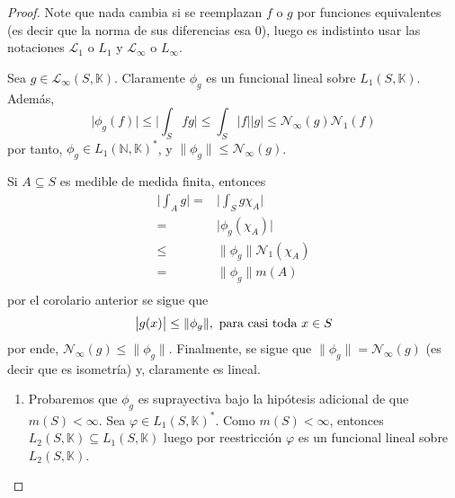 \documentclass[12pt]{report}
\theoremstyle{largebreak}
\newcommand\abs[1]{\ensuremath{\big|#1\big|}}
\newcommand\norm[1]{\ensuremath{\|#1\|}}
\newcommand{\N}[2]{\ensuremath{\mathcal{N}_{#1}\left(#2\right)}}
\begin{document}
    \begin{proof}
        Note que nada cambia si se reemplazan $f$ o $g$ por funciones equivalentes (es decir que la norma de sus diferencias esa 0), luego es indistinto usar las notaciones $\mathcal{L}_1$ o $L_1$
        y $\mathcal{L}_\infty$ o $L_\infty$.

        Sea $g\in\mathcal{L}_\infty(S,\mathbb{K})$. Claramente $\phi_g$ es un funcional lineal sobre $L_1(S,\mathbb{K})$. Además, 
        \begin{equation*}
            \abs{\phi_g(f)}\leq\abs{\int_S fg}\leq\int_S\abs{f}\abs{g}\leq \N{\infty}{g}\N{1}{f}
        \end{equation*}
        por tanto, $\phi_g\in L_1(\mathbb{N},\mathbb{K})^*$, y $\norm{\phi_g}\leq\N{\infty}{g}$.

        Si $A\subseteq S$ es medible de medida finita, entonces
        \begin{equation*}
            \begin{split}
                \abs{\int_A g}=&\abs{\int_S g\chi_A}\\
                =&\abs{\phi_g(\chi_A)} \\
                \leq&\norm{\phi_g}\N{1}{\chi_A} \\
                =&\norm{\phi_g}m(A)\\
            \end{split}
        \end{equation*}
        por el corolario anterior se sigue que
        \begin{equation*}
            \abs{g(x)}\leq\norm{\phi_g},\textup{ para casi toda }x\in S
        \end{equation*}
        por ende, $\N{\infty}{g}\leq\norm{\phi_g}$. Finalmente, se sigue que $\norm{\phi_g}=\N{\infty}{g}$ (es decir que es isometría) y, claramente es lineal.

        \begin{enumerate}
            \item Probaremos que $\phi_g$ es suprayectiva bajo la hipótesis adicional de que $m(S)<\infty$. Sea $\varphi\in L_1(S,\mathbb{K})^*$. Como $m(S)<\infty$, entonces $L_2(S,\mathbb{K})\subseteq L_1(S,\mathbb{K})$ luego por reestricción $\varphi$ es un funcional lineal sobre $L_2(S,\mathbb{K})$.
            

\end{enumerate}
\end{proof}
\end{document}
